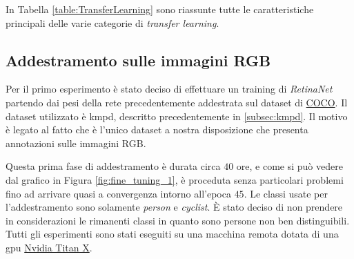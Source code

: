 In Tabella \ref{table:TransferLearning} sono riassunte tutte le caratteristiche principali delle varie categorie di \textit{transfer learning}.
\begin{table}[]
    \centering
    \caption{Schema riassuntivo delle categorie di Transfer Learning}
    \label{table:TransferLearning}
\end{table}
\subsection{Addestramento sulle immagini RGB}
\label{subsec:first_training_rgb_kaist}
Per il primo esperimento è stato deciso di effettuare un training di \textit{RetinaNet} partendo dai pesi della rete precedentemente addestrata sul dataset di \href{http://cocodataset.org/}{COCO}. Il dataset utilizzato è \ac{kmpd}, descritto precedentemente in \ref{subsec:kmpd}. Il motivo è legato al fatto che è l'unico dataset a nostra disposizione che presenta annotazioni sulle immagini RGB.

Questa prima fase di addestramento è durata circa $40$ ore, e come si può vedere dal grafico in Figura \ref{fig:fine_tuning_1}, è proceduta senza particolari problemi fino ad arrivare quasi a convergenza intorno all'epoca $45$. Le classi usate per l'addestramento sono solamente \textit{person} e \textit{cyclist}. È stato deciso di non prendere in considerazioni le rimanenti classi in quanto sono persone non ben distinguibili. Tutti gli esperimenti sono stati eseguiti su una macchina remota dotata di una \ac{gpu} \href{https://www.geforce.com/hardware/desktop-gpus/geforce-gtx-titan-x}{Nvidia Titan X}.

